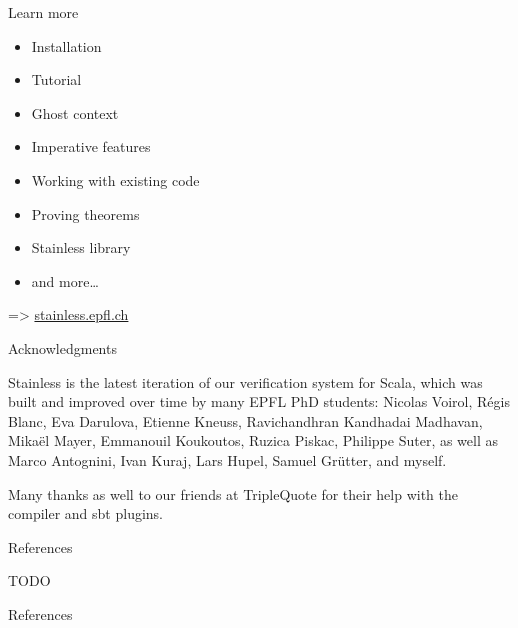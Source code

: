 \documentclass[
  ignorenonframetext,
]{beamer}
\newif\ifbibliography
\providecommand{\tightlist}{%
  \setlength{\itemsep}{0pt}\setlength{\parskip}{0pt}}
\begin{document}
\begin{frame}{Learn more}
\protect\hypertarget{learn-more}{}

\begin{itemize}
\tightlist
\item
  Installation
\item
  Tutorial
\item
  Ghost context
\item
  Imperative features
\item
  Working with existing code
\item
  Proving theorems
\item
  Stainless library
\item
  and more\ldots{}
\end{itemize}

=\textgreater{} \href{https://stainless.epfl.ch}{stainless.epfl.ch}

\end{frame}

\begin{frame}{Acknowledgments}
\protect\hypertarget{acknowledgments}{}

Stainless is the latest iteration of our verification system for Scala,
which was built and improved over time by many EPFL PhD students:
Nicolas Voirol, Régis Blanc, Eva Darulova, Etienne Kneuss, Ravichandhran
Kandhadai Madhavan, Mikaël Mayer, Emmanouil Koukoutos, Ruzica Piskac,
Philippe Suter, as well as Marco Antognini, Ivan Kuraj, Lars Hupel,
Samuel Grütter, and myself.

Many thanks as well to our friends at TripleQuote for their help with
the compiler and sbt plugins.

\end{frame}

\begin{frame}[allowframebreaks]{References}
\protect\hypertarget{references}{}

TODO

\end{frame}

\begin{frame}[allowframebreaks]{References}
  \bibliographytrue
  \printbibliography[heading=none]
\end{frame}
\end{document}
